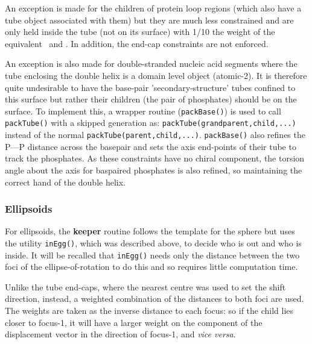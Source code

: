 \documentclass[review]{elsarticle}
\newcommand{\TT}[1]{{\ttfamily\bfseries #1}}
\begin{document}
{{{{{An exception is made for the children of protein loop regions (which also have a
tube object associated with them) but they are much less constrained and are only held
inside the tube (not on its surface) with 1/10 the weight of the equivalent \AH\ and \Bs.  
In addition, the end-cap constraints are not enforced.

An exception is also made for double-stranded nucleic acid segments where the tube enclosing the
double helix is a domain level object (atomic-2).   It is therefore quite undesirable to have the
base-pair 'secondary-structure' tubes confined to this surface but rather their children (the pair
of phosphates) should be on the surface.  To implement this, a wrapper routine ({\tt packBase()})
is used to call {\tt packTube()} with a skipped generation as: {\tt packTube(grandparent,child,...)}
instead of the normal {\tt packTube(parent,child,...)}.  {\tt packBase()} also refines the P---P
distance across the basepair and sets the axis end-points of their tube to track the phosphates.
As these constraints have no chiral component, the torsion angle about the axis for baspaired
phosphates is also refined, so maintaining the correct hand of the double helix.

\subsubsection{Ellipsoids}

For ellipsoids, the \TT{keeper} routine follows the template for the sphere but uses the utility {\tt inEgg()},
which was described above, to decide who is out and who is inside.   It will be recalled that
{\tt inEgg()} needs only the distance between the two foci of the ellipse-of-rotation to do this
and so requires little computation time.

Unlike the tube end-caps, where the nearest centre was used to set the shift direction, instead, a
weighted combination of the distances to both foci are used.   The weights are taken as the inverse distance
to each focus: so if the child lies closer to focus-1, it will have a larger weight
on the component of the displacement vector in the direction of focus-1, and {\em vice versa}. 

}}}}}
\end{document}
